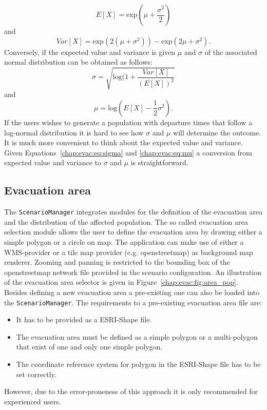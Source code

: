 \begin{equation}
E[X] = \text{exp}(\mu + \frac{\sigma^2}{2})
\end{equation}
and 
\begin{equation}
Var[X]=\text{exp}(2(\mu+\sigma^2))-\text{exp}(2\mu+\sigma^2).
\end{equation}
Conversely, if the expected value and variance is given $\mu$ and $\sigma$ of the associated normal distribution can be obtained as follows:
\begin{equation}
\sigma = \sqrt{\text{log}(1+\frac{Var[X]}{(E[X])^2}}\label{chap:evac:eq:sigma}
\end{equation}
and 
\begin{equation}
\mu = \text{log}(E[X] - \frac{1}{2}\sigma^2).\label{chap:evac:eq:mu}
\end{equation}
If the users wishes to generate a population with departure times that follow a log-normal distribution it is hard to see how $\sigma$ and $\mu$ will determine the outcome. It is much more convenient to think about the expected value and variance. Given Equations~\ref{chap:evac:eq:sigma} and \ref{chap:evac:eq:mu} a conversion from expected value and variance to $\sigma$ and $\mu$ is straightforward.

\subsection{Evacuation area}%
The \verb+ScenarioManager+ integrates modules for the definition of the evacuation area and the distribution of the affected population. The so called evacuation area selection module allows the user to define the evacuation area by drawing either a simple polygon or a circle on map. The application can make use of either a WMS-provider or a tile map provider (e.g. openstreetmap) as background map renderer. Zooming and panning is restricted to the bounding box of the openstreetmap network file provided in the scenario configuration. An illustration of the evacuation area selector is given in Figure~\ref{chap:evac:fig:area_pop}. Besides defining a new evacuation area a pre-existing one can also be loaded into the \verb+ScenarioManager+. The requirements to a pre-existing evacuation area file are:
\begin{itemize}
\item It has to be provided as a ESRI-Shape file.
\item The evacuation area must be defined as a simple polygon or a multi-polygon that exist of one and only one simple polygon.
\item The coordinate reference system for polygon in the ESRI-Shape file has to be set correctly. 
\end{itemize}
However, due to the error-proneness of this approach it is only recommended for experienced users.

